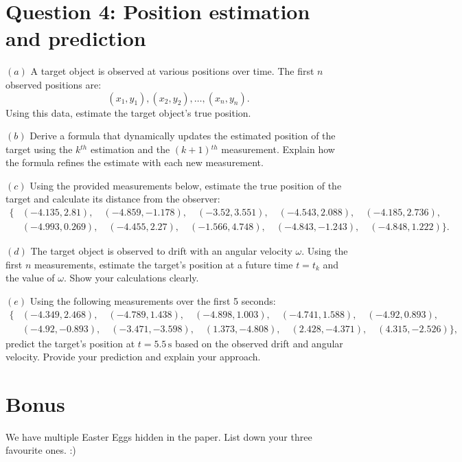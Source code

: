 \documentclass[a4paper, 12pt]{exam}
\begin{document}
\pagebreak
\section*{Question 4: Position estimation and prediction}

\noindent $(a)$ A target object is observed at various positions over time. The first \(n\) observed positions are:
\[
(x_1, y_1), (x_2, y_2), \dots, (x_n, y_n).
\]
Using this data, estimate the target object's true position. 
\bigskip

\noindent $(b)$ Derive a formula that dynamically updates the estimated position of the target using the \(k\)$^{th}$ estimation and the \((k+1)\)$^{th}$ measurement. Explain how the formula refines the estimate with each new measurement.

\bigskip

\noindent $(c)$ Using the provided measurements below, estimate the true position of the target and calculate its distance from the observer:
\[
\begin{aligned}
\{ 
&(-4.135, 2.81), \quad (-4.859, -1.178), \quad (-3.52, 3.551), \quad (-4.543, 2.088), \quad  (-4.185, 2.736), \\
&(-4.993, 0.269), \quad (-4.455, 2.27), \quad (-1.566, 4.748), \quad (-4.843, -1.243), \quad (-4.848, 1.222)
\}.
\end{aligned}
\]

\bigskip

\noindent $(d)$ The target object is observed to drift with an angular velocity $\omega$. Using the first \(n\) measurements, estimate the target’s position at a future time \(t = t_k\) and the value of $\omega$. Show your calculations clearly.

\bigskip

\noindent $(e)$ Using the following measurements over the first 5 seconds:
\[
\begin{aligned}
\{ 
&(-4.349, 2.468), \quad (-4.789, 1.438), \quad (-4.898, 1.003), \quad (-4.741, 1.588), \quad (-4.92, 0.893), \\
&(-4.92, -0.893), \quad (-3.471, -3.598), \quad (1.373, -4.808), \quad (2.428, -4.371), \quad (4.315, -2.526)
\},
\end{aligned}
\]
predict the target's position at \(t = 5.5 \, \text{s}\) based on the observed drift and angular velocity. Provide your prediction and explain your approach.

\bigskip

\pagebreak
\section*{Bonus}

We have multiple Easter Eggs hidden in the paper. List down your three favourite ones. :)
\end{document}
